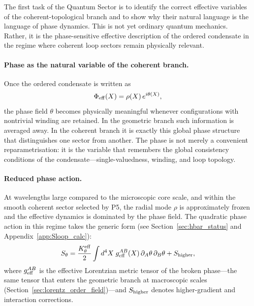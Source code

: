 \medskip
The first task of the Quantum Sector is to identify the correct
effective variables of the coherent-topological branch and to show
why their natural language is the language of phase dynamics.
This is not yet ordinary quantum mechanics.
Rather, it is the phase-sensitive effective description of the ordered
condensate in the regime where coherent loop sectors remain
physically relevant.

\paragraph{Phase as the natural variable of the coherent branch.}
Once the ordered condensate is written as
\begin{equation}
  \Phi_{\rm eff}(X) = \rho(X)\,e^{i\theta(X)},
  \label{eq:qs_polar}
\end{equation}
the phase field $\theta$ becomes physically meaningful whenever
configurations with nontrivial winding are retained.
In the geometric branch such information is averaged away.
In the coherent branch it is exactly this global phase structure that
distinguishes one sector from another.
The phase is not merely a convenient reparametrisation: it is the
variable that remembers the global consistency conditions of the
condensate---single-valuedness, winding, and loop topology.

\paragraph{Reduced phase action.}
At wavelengths large compared to the microscopic core scale, and within
the smooth coherent sector selected by P5, the radial mode $\rho$ is
approximately frozen and the effective dynamics is dominated by the
phase field.
The quadratic phase action in this regime takes the generic form
(see Section~\ref{sec:hbar_status} and Appendix~\ref{app:Sloop_calc}):
\begin{equation}
  \label{eq:qs_phase_action}
  S_\theta
  =
  \frac{K_\theta^{\rm eff}}{2}
  \int d^4X\; g_{\rm eff}^{AB}(X)\,\partial_A\theta\,\partial_B\theta
  + S_{\rm higher},
\end{equation}
where $g_{\rm eff}^{AB}$ is the effective Lorentzian metric tensor of
the broken phase---the same tensor that enters the geometric branch at
macroscopic scales (Section~\ref{sec:lorentz_order_field})---and
$S_{\rm higher}$ denotes higher-gradient and interaction corrections.

